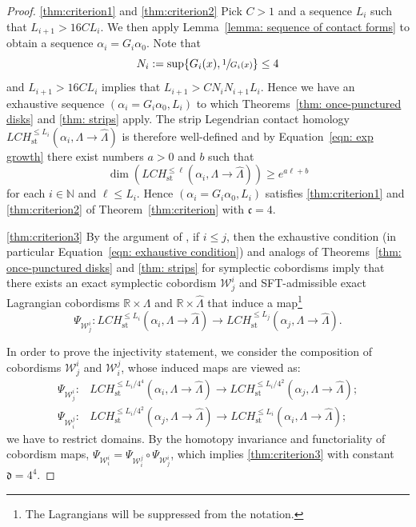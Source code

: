 \documentclass[JEP,XML,SOM,Unicode,NoFloatCountersInSection]{cedram}
\let\mathcal\mathscr
\let\ra\rightarrow
\newcommand{\st}{\mathrm{st}}
\theoremstyle{plain}
\theoremstyle{definition}
\numberwithin{equation}{subsection}
\newcommand{\RR}{\mathbb{R}}
\begin{document}
\skpt
\begin{proof}
\eqref{thm:criterion1} and \eqref{thm:criterion2} Pick $C>1$ and a sequence $L_i$ such that $L_{i+1}> 16 C L_i$. We then apply Lemma~\ref{lemma: sequence of contact forms} to obtain a sequence $\alpha_i=G_i\alpha_0$. Note that $$N_i:=\sup\{G_i(x),\sfrac{1}{G_i(x)}\}\leq 4$$ and $L_{i+1}> 16 C L_i$ implies that $L_{i+1}> C N_i N_{i+1} L_i$. Hence we have an exhaustive sequence $(\alpha_i=G_i\alpha_0, L_i)$ to which Theorems~\ref{thm: once-punctured disks} and \ref{thm: strips} apply. The strip Legendrian contact homology $LCH^{\leq L_i}_{\st}(\alpha_i, \Lambda\ra \widehat{\Lambda})$ is therefore well-defined and by Equation~\eqref{eqn: exp growth} there exist numbers $a>0$ and $b$ such that
\begin{equation}%
\dim(LCH^{\leq \ell}_{\st}(\alpha_i,\Lambda\ra \widehat{\Lambda})) \geq e^{a \ell+b}
\end{equation}
for each $i\in \mathbb{N}$ and $\ell\leq L_i$. Hence $(\alpha_i=G_i\alpha_0,L_i)$ satisfies \eqref{thm:criterion1} and \eqref{thm:criterion2} of Theorem~\ref{thm:criterion} with ${\mathfrak c}=4$.

\eqref{thm:criterion3} By the argument of \cite[\S 10.3]{CH2}, if $i\leq j$, then the exhaustive condition (in particular Equation~\eqref{eqn: exhaustive condition}) and analogs of Theorems~\ref{thm: once-punctured disks} and \ref{thm: strips} for symplectic cobordisms imply that there exists an exact symplectic cobordism $\mathcal{W}^i_j$ and SFT-admissible exact Lagrangian cobordisms $\RR\times\Lambda$ and $\RR\times\widehat\Lambda$ that induce a map\footnote{The Lagrangians will be suppressed from the notation.}
\begin{equation}
\Psi_{\mathcal{W}^i_j}: LCH^{\leq L_i }_{\st}(\alpha_i,\Lambda\ra \widehat{\Lambda}) \to LCH^{\leq L_j}_{\st}(\alpha_j,\Lambda\ra \widehat{\Lambda}).
\end{equation}

In order to prove the injectivity statement, we consider the composition of cobordisms $\mathcal{W}^i_j$ and $\mathcal{W}^j_i$, whose induced maps are viewed as:
\begin{align}
\Psi_{\mathcal{W}^i_j}: & LCH^{\leq L_i/4^4 }_{\st}(\alpha_i,\Lambda\ra \widehat{\Lambda}) \to LCH^{\leq L_i/4^2}_{\st}(\alpha_j,\Lambda\ra \widehat{\Lambda});\\
\Psi_{\mathcal{W}^j_i}: & LCH^{\leq L_i/4^2}_{\st}(\alpha_j,\Lambda\ra \widehat{\Lambda}) \to LCH^{\leq L_i}_{\st}(\alpha_i,\Lambda\ra \widehat{\Lambda});
\end{align}
\ie we have to restrict domains.
By the homotopy invariance and functoriality of cobordism maps, $ \Psi_{\mathcal{W}^i_i}= \Psi_{\mathcal{W}^j_i } \circ \Psi_{\mathcal{W}^i_j}$, which implies \eqref{thm:criterion3} with constant ${\mathfrak d}=4^4$.
\end{proof}
\end{document}
